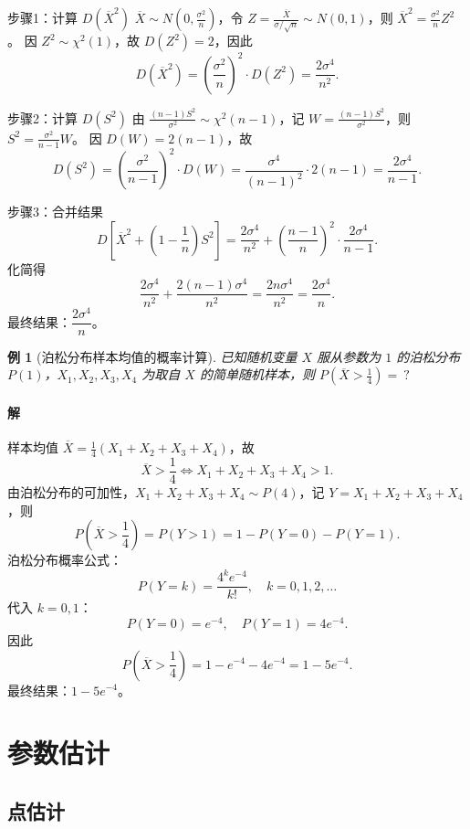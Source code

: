 \documentclass{book}
\newtheorem{example}{例}[subsection]
\begin{document}
步骤1：计算 $D(\overline{X}^2)$
$\overline{X} \sim N\left(0, \frac{\sigma^2}{n}\right)$，令 $Z = \frac{\overline{X}}{\sigma/\sqrt{n}} \sim N(0,1)$，则 $\overline{X}^2 = \frac{\sigma^2}{n} Z^2$。
因 $Z^2 \sim \chi^2(1)$，故 $D(Z^2) = 2$，因此
\[
D(\overline{X}^2) = \left(\frac{\sigma^2}{n}\right)^2 \cdot D(Z^2) = \frac{2\sigma^4}{n^2}.
\]

步骤2：计算 $D(S^2)$
由 $\frac{(n-1)S^2}{\sigma^2} \sim \chi^2(n-1)$，记 $W = \frac{(n-1)S^2}{\sigma^2}$，则 $S^2 = \frac{\sigma^2}{n-1} W$。
因 $D(W) = 2(n-1)$，故
\[
D(S^2) = \left(\frac{\sigma^2}{n-1}\right)^2 \cdot D(W) = \frac{\sigma^4}{(n-1)^2} \cdot 2(n-1) = \frac{2\sigma^4}{n-1}.
\]

步骤3：合并结果
\[
D\left[\overline{X}^2 + \left(1 - \frac{1}{n}\right)S^2\right] = \frac{2\sigma^4}{n^2} + \left(\frac{n-1}{n}\right)^2 \cdot \frac{2\sigma^4}{n-1}.
\]
化简得
\[
\frac{2\sigma^4}{n^2} + \frac{2(n-1)\sigma^4}{n^2} = \frac{2n\sigma^4}{n^2} = \frac{2\sigma^4}{n}.
\]
最终结果：$\boxed{\dfrac{2\sigma^4}{n}}$。

\begin{example}[泊松分布样本均值的概率计算]
已知随机变量 $X$ 服从参数为 $1$ 的泊松分布 $P(1)$，$X_1,X_2,X_3,X_4$ 为取自 $X$ 的简单随机样本，则 $P\left(\overline{X} > \frac{1}{4}\right) = \ ?$
\end{example}

\subsubsection{解}
样本均值 $\overline{X} = \frac{1}{4}(X_1+X_2+X_3+X_4)$，故
\[
\overline{X} > \frac{1}{4} \iff X_1+X_2+X_3+X_4 > 1.
\]
由泊松分布的可加性，$X_1+X_2+X_3+X_4 \sim P(4)$，记 $Y = X_1+X_2+X_3+X_4$，则
\[
P\left(\overline{X} > \frac{1}{4}\right) = P(Y > 1) = 1 - P(Y=0) - P(Y=1).
\]
泊松分布概率公式：
\[
P(Y=k) = \frac{4^k e^{-4}}{k!}, \quad k=0,1,2,\dots
\]
代入 $k=0,1$：
\[
P(Y=0) = e^{-4}, \quad P(Y=1) = 4e^{-4}.
\]
因此
\[
P\left(\overline{X} > \frac{1}{4}\right) = 1 - e^{-4} - 4e^{-4} = 1 - 5e^{-4}.
\]
最终结果：$\boxed{1 - 5e^{-4}}$。

\chapter{参数估计}
\section{点估计}
\end{document}
